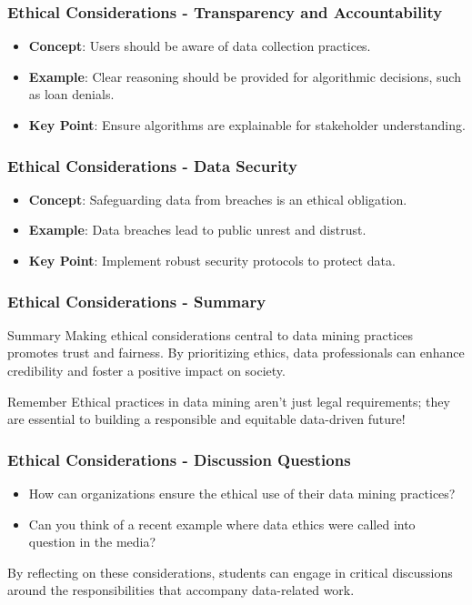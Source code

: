 \documentclass{beamer}
\begin{document}
\begin{frame}[fragile]
    \frametitle{Ethical Considerations - Transparency and Accountability}
    \begin{itemize}
        \item \textbf{Concept}: Users should be aware of data collection practices.
        \item \textbf{Example}: Clear reasoning should be provided for algorithmic decisions, such as loan denials.
        \item \textbf{Key Point}: Ensure algorithms are explainable for stakeholder understanding.
    \end{itemize}
\end{frame}

\begin{frame}[fragile]
    \frametitle{Ethical Considerations - Data Security}
    \begin{itemize}
        \item \textbf{Concept}: Safeguarding data from breaches is an ethical obligation.
        \item \textbf{Example}: Data breaches lead to public unrest and distrust.
        \item \textbf{Key Point}: Implement robust security protocols to protect data.
    \end{itemize}
\end{frame}

\begin{frame}[fragile]
    \frametitle{Ethical Considerations - Summary}
    \begin{block}{Summary}
        Making ethical considerations central to data mining practices promotes trust and fairness. By prioritizing ethics, data professionals can enhance credibility and foster a positive impact on society.
    \end{block}
    \begin{block}{Remember}
        Ethical practices in data mining aren’t just legal requirements; they are essential to building a responsible and equitable data-driven future!
    \end{block}
\end{frame}

\begin{frame}[fragile]
    \frametitle{Ethical Considerations - Discussion Questions}
    \begin{itemize}
        \item How can organizations ensure the ethical use of their data mining practices?
        \item Can you think of a recent example where data ethics were called into question in the media?
    \end{itemize}
    By reflecting on these considerations, students can engage in critical discussions around the responsibilities that accompany data-related work.
\end{frame}
\end{document}
